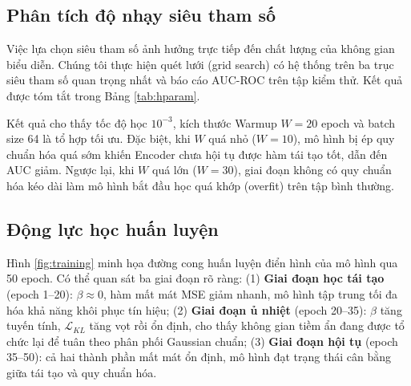 \documentclass[conference]{IEEEtran}
\begin{document}
\subsection{Phân tích độ nhạy siêu tham số}
Việc lựa chọn siêu tham số ảnh hưởng trực tiếp đến chất lượng của không gian biểu diễn. Chúng tôi thực hiện quét lưới (grid search) có hệ thống trên ba trục siêu tham số quan trọng nhất và báo cáo AUC-ROC trên tập kiểm thử. Kết quả được tóm tắt trong Bảng \ref{tab:hparam}.

\begin{table}[htbp]
\caption{Kết quả quét lưới siêu tham số (AUC-ROC trên tập kiểm thử ECG5000)}
\centering
{}
\label{tab:hparam}
\end{table}

Kết quả cho thấy tốc độ học $10^{-3}$, kích thước Warmup $W=20$ epoch và batch size 64 là tổ hợp tối ưu. Đặc biệt, khi $W$ quá nhỏ ($W=10$), mô hình bị ép quy chuẩn hóa quá sớm khiến Encoder chưa hội tụ được hàm tái tạo tốt, dẫn đến AUC giảm. Ngược lại, khi $W$ quá lớn ($W=30$), giai đoạn không có quy chuẩn hóa kéo dài làm mô hình bắt đầu học quá khớp (overfit) trên tập bình thường.

\subsection{Động lực học huấn luyện}
Hình \ref{fig:training} minh họa đường cong huấn luyện điển hình của mô hình qua 50 epoch. Có thể quan sát ba giai đoạn rõ ràng: (1) \textbf{Giai đoạn học tái tạo} (epoch 1--20): $\beta \approx 0$, hàm mất mát MSE giảm nhanh, mô hình tập trung tối đa hóa khả năng khôi phục tín hiệu; (2) \textbf{Giai đoạn ủ nhiệt} (epoch 20--35): $\beta$ tăng tuyến tính, $\mathcal{L}_{KL}$ tăng vọt rồi ổn định, cho thấy không gian tiềm ẩn đang được tổ chức lại để tuân theo phân phối Gaussian chuẩn; (3) \textbf{Giai đoạn hội tụ} (epoch 35--50): cả hai thành phần mất mát ổn định, mô hình đạt trạng thái cân bằng giữa tái tạo và quy chuẩn hóa.
\end{document}
